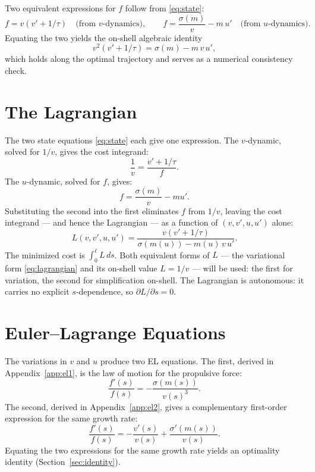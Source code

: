 \documentclass[11pt]{article}
\begin{document}
Two equivalent expressions for $f$ follow from \eqref{eq:state}:
\begin{equation}
f = v(v' + 1/\tau) \quad \text{(from $v$-dynamics)}, \qquad f = \frac{\sigma(m)}{v} - m\, u' \quad \text{(from $u$-dynamics)}.
\end{equation}
Equating the two yields the on-shell algebraic identity
\begin{equation}
v^2 (v' + 1/\tau) = \sigma(m) - m\, v\, u',
\end{equation}
which holds along the optimal trajectory and serves as a numerical consistency check.

\section{The Lagrangian}

The two state equations \eqref{eq:state} each give one expression. The $v$-dynamic, solved for $1/v$, gives the cost integrand:
\[
\frac{1}{v} = \frac{v' + 1/\tau}{f}.
\]
The $u$-dynamic, solved for $f$, gives:
\[
f = \frac{\sigma(m)}{v} - mu'.
\]
Substituting the second into the first eliminates $f$ from $1/v$, leaving the cost integrand --- and hence the Lagrangian --- as a function of $(v, v', u, u')$ alone:
\begin{equation}\label{eq:lagrangian}
L(v, v', u, u') = \frac{v(v' + 1/\tau)}{\sigma(m(u)) - m(u)\, v\, u'}.
\end{equation}
The minimized cost is $\int_0^\ell L\, ds$. Both equivalent forms of $L$ --- the variational form \eqref{eq:lagrangian} and its on-shell value $L = 1/v$ --- will be used: the first for variation, the second for simplification on-shell. The Lagrangian is autonomous: it carries no explicit $s$-dependence, so $\partial L/\partial s = 0$.

\section{Euler--Lagrange Equations}

The variations in $v$ and $u$ produce two EL equations. The first, derived in Appendix~\ref{app:el1}, is the law of motion for the propulsive force:
\begin{equation}\label{eq:el1}
\frac{f'(s)}{f(s)} = - \frac{\sigma(m(s))}{v(s)^3}.
\end{equation}
The second, derived in Appendix~\ref{app:el2}, gives a complementary first-order expression for the same growth rate:
\begin{equation}\label{eq:el2}
\frac{f'(s)}{f(s)} = - \frac{v'(s)}{v(s)} + \frac{\sigma'(m(s))}{v(s)}.
\end{equation}
Equating the two expressions for the same growth rate yields an optimality identity (Section~\ref{sec:identity}).
\end{document}
